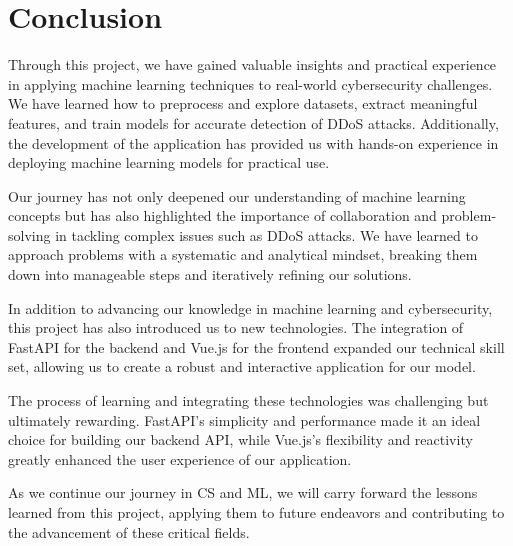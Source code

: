 \chapter*{Conclusion}

\thispagestyle{noheader}

Through this project, we have gained valuable insights and practical experience in applying machine learning techniques to real-world cybersecurity challenges. We have learned how to preprocess and explore datasets, extract meaningful features, and train models for accurate detection of DDoS attacks. Additionally, the development of the application has provided us with hands-on experience in deploying machine learning models for practical use.

Our journey has not only deepened our understanding of machine learning concepts but has also highlighted the importance of collaboration and problem-solving in tackling complex issues such as DDoS attacks. We have learned to approach problems with a systematic and analytical mindset, breaking them down into manageable steps and iteratively refining our solutions.

In addition to advancing our knowledge in machine learning and cybersecurity, this project has also introduced us to new technologies. The integration of FastAPI for the backend and Vue.js for the frontend expanded our technical skill set, allowing us to create a robust and interactive application for our model. 

The process of learning and integrating these technologies was challenging but ultimately rewarding. FastAPI's simplicity and performance made it an ideal choice for building our backend API, while Vue.js's flexibility and reactivity greatly enhanced the user experience of our application.

As we continue our journey in CS and ML, we will carry forward the lessons learned from this project, applying them to future endeavors and contributing to the advancement of these critical fields.